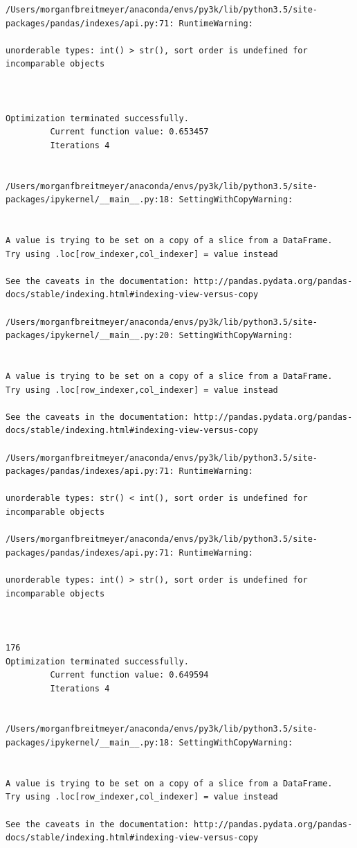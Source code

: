 \begin{lstlisting}
/Users/morganfbreitmeyer/anaconda/envs/py3k/lib/python3.5/site-packages/pandas/indexes/api.py:71: RuntimeWarning:

unorderable types: int() > str(), sort order is undefined for incomparable objects



Optimization terminated successfully.
         Current function value: 0.653457
         Iterations 4


/Users/morganfbreitmeyer/anaconda/envs/py3k/lib/python3.5/site-packages/ipykernel/__main__.py:18: SettingWithCopyWarning:


A value is trying to be set on a copy of a slice from a DataFrame.
Try using .loc[row_indexer,col_indexer] = value instead

See the caveats in the documentation: http://pandas.pydata.org/pandas-docs/stable/indexing.html#indexing-view-versus-copy

/Users/morganfbreitmeyer/anaconda/envs/py3k/lib/python3.5/site-packages/ipykernel/__main__.py:20: SettingWithCopyWarning:


A value is trying to be set on a copy of a slice from a DataFrame.
Try using .loc[row_indexer,col_indexer] = value instead

See the caveats in the documentation: http://pandas.pydata.org/pandas-docs/stable/indexing.html#indexing-view-versus-copy

/Users/morganfbreitmeyer/anaconda/envs/py3k/lib/python3.5/site-packages/pandas/indexes/api.py:71: RuntimeWarning:

unorderable types: str() < int(), sort order is undefined for incomparable objects

/Users/morganfbreitmeyer/anaconda/envs/py3k/lib/python3.5/site-packages/pandas/indexes/api.py:71: RuntimeWarning:

unorderable types: int() > str(), sort order is undefined for incomparable objects



176
Optimization terminated successfully.
         Current function value: 0.649594
         Iterations 4


/Users/morganfbreitmeyer/anaconda/envs/py3k/lib/python3.5/site-packages/ipykernel/__main__.py:18: SettingWithCopyWarning:


A value is trying to be set on a copy of a slice from a DataFrame.
Try using .loc[row_indexer,col_indexer] = value instead

See the caveats in the documentation: http://pandas.pydata.org/pandas-docs/stable/indexing.html#indexing-view-versus-copy


\end{lstlisting}

